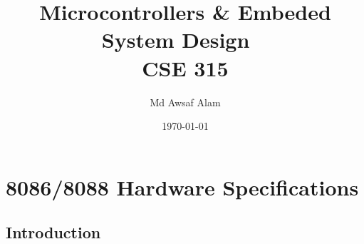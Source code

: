 \documentclass{article}
\title{Microcontrollers \& Embeded System Design ~\textbf{\\CSE 315}}
\author{Md Awsaf Alam}
\date{\today}
\begin{document}
\maketitle
\newpage

\tableofcontents

\newpage


\section{8086/8088 Hardware Specifications}

\subsection{Introduction}
\label{sec:intro_text}
\end{document}
